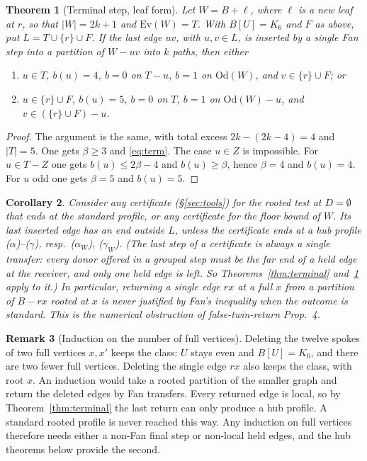 \documentclass[11pt]{amsart}
\newtheorem{theorem}{Theorem}[section]
\newtheorem{corollary}[theorem]{Corollary}
\theoremstyle{definition}
\newtheorem{remark}[theorem]{Remark}
\newcommand{\Ev}{\mathrm{Ev}}
\newcommand{\Od}{\mathrm{Od}}
\begin{document}
\begin{theorem}[Terminal step, leaf form]\label{thm:terminalW}
Let $W=B+\ell$, where $\ell$ is a new leaf at $r$, so that $|W|=2k+1$ and $\Ev(W)=T$. With
$B[U]=K_6$ and $F$ as above, put $L=T\cup\{r\}\cup F$. If the last edge $uv$, with $u,v\in L$, is
inserted by a single Fan step into a partition of $W-uv$ into $k$ paths, then either
\begin{enumerate}[label=($\alpha_W$)]
\item[($\alpha_W$)] $u\in T$, $b(u)=4$, $b=0$ on $T-u$, $b=1$ on $\Od(W)$, and $v\in\{r\}\cup F$; or
\item[($\gamma_W$)] $u\in\{r\}\cup F$, $b(u)=5$, $b=0$ on $T$, $b=1$ on $\Od(W)-u$, and
$v\in(\{r\}\cup F)-u$.
\end{enumerate}
\end{theorem}
\begin{proof}
The argument is the same, with total excess $2k-(2k-4)=4$ and $|T|=5$. One gets $\beta\ge3$ and
\eqref{eq:term}. The case $u\in Z$ is impossible. For $u\in T-Z$ one gets $b(u)\le2\beta-4$ and
$b(u)\ge\beta$, hence $\beta=4$ and $b(u)=4$. For $u$ odd one gets $\beta=5$ and $b(u)=5$.
\end{proof}

\begin{corollary}\label{cor:nonlocal}
Consider any certificate (\S\ref{sec:tools}) for the rooted test at $D=\emptyset$ that ends at the
standard profile, or any certificate for the floor bound of $W$. Its last inserted edge has an end
outside $L$, unless the certificate ends at a hub profile ($\alpha$)--($\gamma$), resp.\
($\alpha_W$), ($\gamma_W$). (The last step of a certificate is always a single transfer: every
donor offered in a grouped step must be the far end of a held edge at the receiver, and only one
held edge is left. So Theorems~\ref{thm:terminal} and~\ref{thm:terminalW} apply to it.) In particular, returning a single edge $rx$ at a full $x$ from a
partition of $B-rx$ rooted at $x$ is never justified by Fan's inequality when the outcome is
standard. This is the numerical obstruction of false-twin-return Prop.~4.
\end{corollary}

\begin{remark}[Induction on the number of full vertices]\label{rem:induction}
Deleting the twelve spokes of two full vertices $x,x'$ keeps the class: $U$ stays even and
$B[U]=K_6$, and there are two fewer full vertices. Deleting the single edge $rx$ also keeps the
class, with root $x$. An induction would take a rooted partition of the smaller graph and return
the deleted edges by Fan transfers. Every returned edge is local, so by Theorem~\ref{thm:terminal}
the last return can only produce a hub profile. A standard rooted profile is never reached this
way. Any induction on full vertices therefore needs either a non-Fan final step or non-local held
edges, and the hub theorems below provide the second.
\end{remark}
\end{document}
